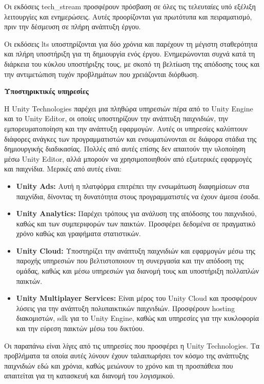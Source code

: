 Οι εκδόσεις \gls{tech_stream} προσφέρουν πρόσβαση σε όλες τις τελευταίες υπό εξέλιξη λειτουργίες και ενημερώσεις. Αυτές προορίζονται για πρωτότυπα και πειραματισμό, πριν την δέσμευση σε πλήρη ανάπτυξη έργου.

Οι εκδόσεις \acrshort{lts} υποστηρίζονται για δύο χρόνια και παρέχουν τη μέγιστη σταθερότητα και πλήρη υποστήριξη για τη δημιουργία ενός έργου. Ενημερώνονται συχνά κατά τη διάρκεια του κύκλου υποστήριξης τους, με σκοπό τη βελτίωση της απόδοσης τους και την αντιμετώπιση τυχόν προβλημάτων που χρειάζονται διόρθωση\cite{technologies_lts_nodate}.

\textbf{Υποστηρικτικές υπηρεσίες}

Η Unity Technologies παρέχει μια πληθώρα υπηρεσιών πέρα από το Unity Engine και το Unity Editor, οι οποίες υποστηρίζουν την ανάπτυξη παιχνιδιών, την εμπορευματοποίηση και την ανάπτυξη εφαρμογών. Αυτές οι υπηρεσίες καλύπτουν διάφορες ανάγκες των προγραμματιστών και ενσωματώνονται σε διάφορα στάδια της δημιουργικής διαδικασίας. Πολλές από αυτές επίσης δεν απαιτούν την υλοποίηση μέσω Unity Editor, αλλά μπορούν να χρησιμοποιηθούν από εξωτερικές εφαρμογές και παιχνίδια. Μερικές από αυτές είναι:

\begin{itemize}
    \item \textbf{Unity Ads:} Αυτή η πλατφόρμα επιτρέπει την ενσωμάτωση διαφημίσεων στα παιχνίδια, δίνοντας τη δυνατότητα στους προγραμματιστές να έχουν άμεσα έσοδα\cite{noauthor_unity_nodate-1}.
    \item \textbf{Unity Analytics:} Παρέχει τρόπους για ανάλυση της απόδοσης του παιχνιδιού, καθώς και των συμπεριφορών των παικτών. Προσφέρει δεδομένα σε πραγματικό χρόνο καθώς και γραφήματα στατιστικών\cite{noauthor_game_nodate}.
    \item \textbf{Unity Cloud:} Υποστηρίζει την ανάπτυξη παιχνιδιών και εφαρμογών μέσω της παροχής υπηρεσιών που βελτιστοποιουν τη συνεργασία και την απόδοση της ομάδας, καθώς και μέσω υπηρεσιών για διανομή τους και υποστήριξη πολλαπλών παικτών\cite{noauthor_unity_nodate-3}.
    \item \textbf{Unity Multiplayer Services:} Είναι μέρος του Unity Cloud και προσφέρουν λύσεις για την ανάπτυξη πολυπαικτικών παιχνιδιών. Προσφέρουν hosting διακομιστών, \acrfull{sdk} για το Unity Engine, καθώς και υπηρεσίες για την κυκλοφορία και την εύρεση παικτών μέσω του δικτύου\cite{noauthor_multiplayer_nodate}.
\end{itemize}

Οι παραπάνω είναι λίγες από τις υπηρεσίες που προσφέρει η Unity Technologies. Τα προβλήματα τα οποία αυτές λύνουν έχουν ταλαιπωρήσει τον κόσμο της ανάπτυξης παιχνιδιών εδώ και χρόνια, καθώς μειώνουν το χρόνο και τη προσπάθεια που απαιτείται για τη κατασκευή και διανομή του λογισμικού\cite{al-said_ahmad_scalability_2019}.

